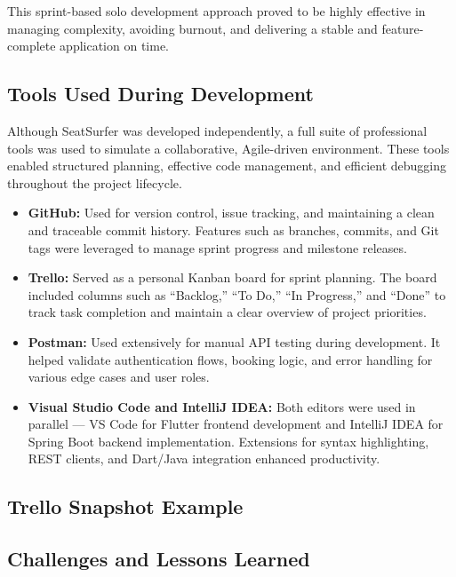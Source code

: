 \documentclass[12pt,a4paper]{report} %
\begin{document}
This sprint-based solo development approach proved to be highly effective in managing complexity, avoiding burnout, and delivering a stable and feature-complete application on time.

\subsection{Tools Used During Development}

Although SeatSurfer was developed independently, a full suite of professional tools was used to simulate a collaborative, Agile-driven environment. These tools enabled structured planning, effective code management, and efficient debugging throughout the project lifecycle.

\begin{itemize}
\item \textbf{GitHub:}
Used for version control, issue tracking, and maintaining a clean and traceable commit history. Features such as branches, commits, and Git tags were leveraged to manage sprint progress and milestone releases.
\item \textbf{Trello:}  
Served as a personal Kanban board for sprint planning. The board included columns such as “Backlog,” “To Do,” “In Progress,” and “Done” to track task completion and maintain a clear overview of project priorities.
\item \textbf{Postman:}  
Used extensively for manual API testing during development. It helped validate authentication flows, booking logic, and error handling for various edge cases and user roles.
\item \textbf{Visual Studio Code and IntelliJ IDEA:}  
Both editors were used in parallel — VS Code for Flutter frontend development and IntelliJ IDEA for Spring Boot backend implementation. Extensions for syntax highlighting, REST clients, and Dart/Java integration enhanced productivity.
\end{itemize}

\subsection*{Trello Snapshot Example}


\subsection{Challenges and Lessons Learned}
\end{document}
